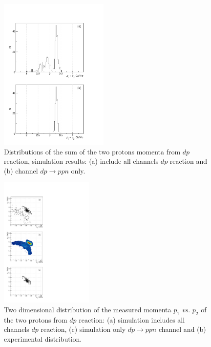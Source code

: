 \documentclass[twocolumn,epjc3]{svjour3}
\newcommand{\dpfrag} {\ensuremath{dp \rightarrow ppn}\xspace}
\begin{document}
\begin{figure}[h]
  \centering
  \includegraphics[width=0.48\textwidth]{p1_plus_p2_2.pdf}
  \caption{Distributions of the sum of the two protons momenta from $dp$
    reaction, simulation results: (a) include all channels $dp$ reaction and (b)
    channel \dpfrag only.}
  \label{fig:p1p2sim}
\end{figure}

%

\begin{figure}[t]
  \centering
  \includegraphics[width=0.41\textwidth]{p1_vs_p2_1.pdf} %
  \caption{Two dimensional distribution of the measured momenta $p_1$
    \textit{vs.} $p_2$ of the two protons from $dp$ reaction: (a) simulation
    includes all channels $dp$ reaction, (c) simulation only \dpfrag channel and
    (b) experimental distribution.}
  \label{fig:p1vsp2}
\end{figure}
\end{document}
